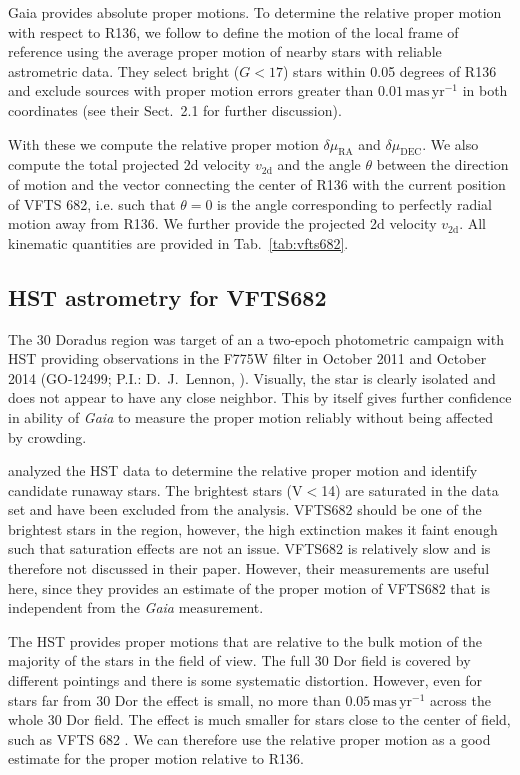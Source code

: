 \documentclass[apjl,twocolumn]{emulateapj}
\newcommand{\masyr}{\,\mathrm{mas}\,\mathrm{yr}^{-1}}
\begin{document}
Gaia provides absolute proper motions.  To determine the relative proper motion with respect to R136, we follow  \citet{lennon:18} to define the motion of the local frame of reference using the average proper motion of nearby stars with reliable astrometric data.  They select  bright ($G<17$) stars within 0.05 degrees of R136 and exclude sources with proper motion errors greater than $0.01\masyr$ in both coordinates (see their  Sect.~2.1 for further discussion).  

With these we compute the relative proper motion
$\delta\mu_\mathrm{RA}$ and $\delta\mu_\mathrm{DEC}$.   We also compute the total projected 2d velocity
$v_\mathrm{2d}$ and
the angle $\theta$ between the direction of motion and the vector
connecting the center of R136 with the current position of VFTS 682,
i.e. such that $\theta = 0$ is the angle corresponding to perfectly
radial motion away from R136.    We further provide the projected 2d velocity
$v_\mathrm{2d}$.   All kinematic quantities are provided in
Tab.~\ref{tab:vfts682}. 



\subsection{HST astrometry for VFTS682}

The 30 Doradus region was target of an a two-epoch photometric campaign with HST providing observations in the F775W filter in October 2011 and October 2014 (GO-12499; P.I.: D.~J.~Lennon, \citealt{sabbi:13}). Visually, the star is clearly isolated and does not appear to have any close neighbor. This by itself gives further confidence in ability of \emph{Gaia} to measure the proper motion reliably without being affected by crowding. 

\citet{platais:15, platais:18} analyzed the HST data to determine the
relative proper motion and identify candidate runaway stars. The
brightest stars (V$<$14) are saturated in the data set and have been
excluded from the analysis.  VFTS682 should be one of the brightest
stars in the region, however, the high extinction makes it faint enough such that saturation effects are not an issue.   VFTS682 is relatively slow and is therefore not discussed in their paper.  However, their measurements are useful here, since they provides an  estimate of the proper motion of VFTS682 that is independent from the \emph{Gaia} measurement. 
 
The HST provides proper motions that are relative to the bulk motion of the majority of the stars in the field of view. The full 30 Dor field is covered by different pointings and there is some systematic distortion.  However, even for stars far from 30 Dor the effect is small, no more than $0.05\masyr$ across the whole 30 Dor field. The effect is much smaller for stars close to the center of field, such as VFTS 682 \citet{platais:18}.  We can therefore use the relative proper motion as a good estimate for the proper motion relative to R136. 
 
\end{document}
